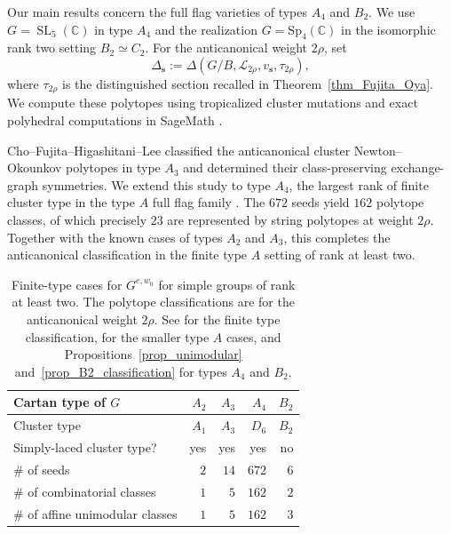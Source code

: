\documentclass[10pt]{amsart}
\numberwithin{equation}{section}
\DeclareMathOperator{\SL}{SL}
\newcommand{\C}{{\mathbb{C}}}
\theoremstyle{plain}
\theoremstyle{definition}
\theoremstyle{remark}
\begin{document}
Our main results concern the full flag varieties of
types $A_4$ and $B_2$. We use $G=\SL_5(\C)$ in type $A_4$
and the realization $G=\mathrm{Sp}_4(\C)$ in the
isomorphic rank two setting $B_2\simeq C_2$.
For the anticanonical weight $2\rho$, set
\[
\Delta_{\bm s}
:=\Delta(G/B,\mathcal L_{2\rho},v_{\bm s},\tau_{2\rho}),
\]
where $\tau_{2\rho}$ is the distinguished section recalled
in Theorem~\ref{thm_Fujita_Oya}.
We compute these polytopes using tropicalized cluster
mutations and exact polyhedral computations in SageMath
\cite{FujitaOya,sagemath}.

Cho--Fujita--Higashitani--Lee \cite{CFHL} classified the
anticanonical cluster Newton--Okounkov polytopes in type $A_3$
and determined their class-preserving exchange-graph symmetries.
We extend this study to type $A_4$, the largest rank of finite
cluster type in the type $A$ full flag family
\cite[Proposition~2.26]{BFZ05}.
The $672$ seeds yield $162$ polytope classes, of which precisely
$23$ are represented by string polytopes at weight $2\rho$.
Together with the known cases of types $A_2$ and $A_3$, this
completes the anticanonical classification in the finite 
type $A$ setting of rank at least two.

\begin{table}
	\centering
	\begin{tabular}{l|rrrr}
		\toprule
		Cartan type of $G$ & $A_2$ & $A_3$ & $A_4$ & $B_2$ \\
		\midrule
		Cluster type & $A_1$ & $A_3$ & $D_6$ & $B_2$ \\
		Simply-laced cluster type? & yes & yes & yes & no \\
		\# of seeds & $2$ & $14$ & $672$ & $6$ \\
		\# of combinatorial classes & $1$ & $5$ & $162$ & $2$ \\
		\# of affine unimodular classes & $1$ & $5$ & $162$ & $3$ \\
		\bottomrule
	\end{tabular}
	\caption{Finite-type cases for $G^{e,w_0}$ for simple
		groups of rank at least two.
		The polytope classifications are for the anticanonical
		weight $2\rho$. See \cite{BFZ05} for the finite type
		classification, \cite{CKLP21,CFHL} for the smaller
		type $A$ cases, and
		Propositions~\ref{prop_unimodular}
		and~\ref{prop_B2_classification} for types $A_4$ and $B_2$.}
	\label{table_finite_type}
\end{table}
\end{document}
